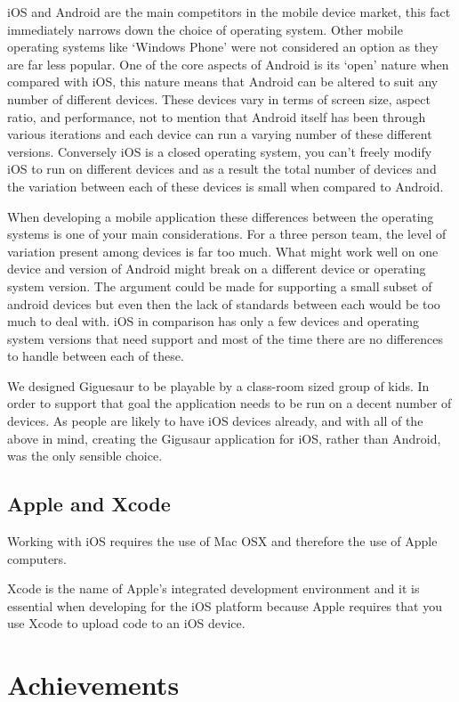\documentclass{article}
\begin{document}
iOS and Android are the main competitors in the mobile device market, this fact immediately narrows down the choice of operating system. Other mobile operating systems like `Windows Phone' were not considered an option as they are far less popular. One of the core aspects of Android is its `open' nature when compared with iOS, this nature means that Android can be altered to suit any number of different devices. These devices vary in terms of screen size, aspect ratio, and performance, not to mention that Android itself has been through various iterations and each device can run a varying number of these different versions. Conversely iOS is a closed operating system, you can't freely modify iOS to run on different devices and as a result the total number of devices and the variation between each of these devices is small when compared to Android. 

When developing a mobile application these differences between the operating systems is one of your main considerations. For a three person team, the level of variation present among devices is far too much. What might work well on one device and version of Android might break on a different device or operating system version. The argument could be made for supporting a small subset of android devices but even then the lack of standards between each would be too much to deal with. iOS in comparison has only a few devices and operating system versions that need support and most of the time there are no differences to handle between each of these. 

We designed Giguesaur to be playable by a class-room sized group of kids. In order to support that goal the application needs to be run on a decent number of devices. As people are likely to have iOS devices already, and with all of the above in mind, creating the Gigusaur application for iOS, rather than Android, was the only sensible choice. 

\subsection{Apple and Xcode}

Working with iOS requires the use of Mac OSX and therefore the use of Apple computers. 

Xcode is the name of Apple's integrated development environment and it is essential when developing for the iOS platform because Apple requires that you use Xcode to upload code to an iOS device.

\section{Achievements}
\end{document}
